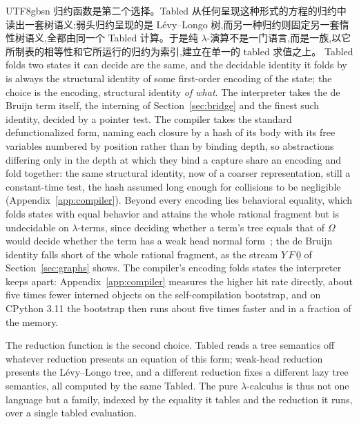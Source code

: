 \begin{CJK*}{UTF8}{gbsn}
  归约函数是第二个选择。\textsf{Tabled} 从任何呈现这种形式的方程的归约中读出一套树语义;弱头归约呈现的是 Lévy--Longo 树,而另一种归约则固定另一套惰性树语义,全都由同一个 \textsf{Tabled} 计算。于是纯 $\lambda$-演算不是一门语言,而是一族,以它所制表的相等性和它所运行的归约为索引,建立在单一的 tabled 求值之上。
  \else
  \textsf{Tabled} folds two states it can decide are the same, and the decidable identity it folds by is always the structural identity of some first-order encoding of the state; the choice is the encoding, structural identity \emph{of what}. The interpreter takes the de Bruijn term itself, the interning of Section~\ref{sec:bridge} and the finest such identity, decided by a pointer test. The compiler takes the standard defunctionalized form, naming each closure by a hash of its body with its free variables numbered by position rather than by binding depth, so abstractions differing only in the depth at which they bind a capture share an encoding and fold together: the same structural identity, now of a coarser representation, still a constant-time test, the hash assumed long enough for collisions to be negligible (Appendix~\ref{app:compiler}). Beyond every encoding lies behavioral equality, which folds states with equal behavior and attains the whole rational fragment but is undecidable on $\lambda$-terms, since deciding whether a term's tree equals that of $\Omega$ would decide whether the term has a weak head normal form~\cite{barendregt1984-lambda-calculus}; the de Bruijn identity falls short of the whole rational fragment, as the stream $Y\,F\,\underline{0}$ of Section~\ref{sec:graphs} shows. The compiler's encoding folds states the interpreter keeps apart: Appendix~\ref{app:compiler} measures the higher hit rate directly, about five times fewer interned objects on the self-compilation bootstrap, and on CPython 3.11 the bootstrap then runs about five times faster and in a fraction of the memory.

  The reduction function is the second choice. \textsf{Tabled} reads a tree semantics off whatever reduction presents an equation of this form; weak-head reduction presents the L\'evy--Longo tree, and a different reduction fixes a different lazy tree semantics, all computed by the same \textsf{Tabled}. The pure $\lambda$-calculus is thus not one language but a family, indexed by the equality it tables and the reduction it runs, over a single tabled evaluation.
  \fi

  \section{}\label{sec:related}


\end{CJK*}
